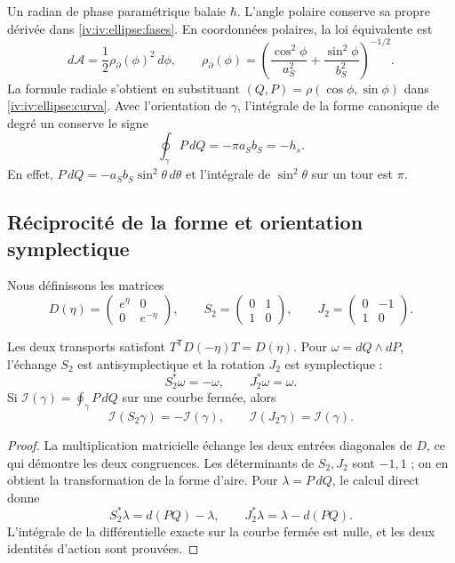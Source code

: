Un radian de phase paramétrique balaie \(\hbar\). L’angle
polaire conserve sa propre dérivée dans
\eqref{iv:iv:ellipse:fases}. En coordonnées polaires, la loi
équivalente est
\[
 d\mathcal A=\frac12\rho_{\partial}(\phi)^2\,d\phi,\qquad
 \rho_{\partial}(\phi)=
 \left(\frac{\cos^2\phi}{a_S^2}
       +\frac{\sin^2\phi}{b_S^2}\right)^{-1/2}.
\]
La formule radiale s’obtient en substituant
\((Q,P)=\rho(\cos\phi,\sin\phi)\) dans
\eqref{iv:iv:ellipse:curva}. Avec l’orientation de
\(\gamma\), l’intégrale de la forme canonique de degré un conserve
le signe
\begin{equation}
 \oint_\gamma P\,dQ=-\pi a_Sb_S=-h_s.
 \label{iv:iv:ellipse:accion-orientada}
\end{equation}
En effet, \(P\,dQ=-a_Sb_S\sin^2\theta\,d\theta\) et
l’intégrale de \(\sin^2\theta\) sur un tour est \(\pi\).

\subsection{Réciprocité de la forme et orientation symplectique}
\label{iv:iv:ellipse:reciprocidad}

Nous définissons les matrices
\begin{equation}
 D(\eta)=\begin{pmatrix}e^\eta&0\\0&e^{-\eta}\end{pmatrix},
 \qquad
 S_2=\begin{pmatrix}0&1\\1&0\end{pmatrix},
 \qquad
 J_2=\begin{pmatrix}0&-1\\1&0\end{pmatrix}.
 \label{iv:iv:ellipse:transportes}
\end{equation}

\begin{proposition}
\label{iv:iv:ellipse:accion-reciproca}
Les deux transports satisfont
\(T^{\mathsf T}D(-\eta)T=D(\eta)\).
Pour \(\omega=dQ\wedge dP\), l’échange \(S_2\) est
antisymplectique et la rotation \(J_2\) est symplectique :
\[
 S_2^*\omega=-\omega,\qquad J_2^*\omega=\omega.
\]
Si \(\mathcal I(\gamma)=\oint_\gamma P\,dQ\) sur une
courbe fermée, alors
\begin{equation}
 \mathcal I(S_2\gamma)=-\mathcal I(\gamma),\qquad
 \mathcal I(J_2\gamma)=\mathcal I(\gamma).
 \label{iv:iv:ellipse:signos-accion}
\end{equation}
\end{proposition}
\begin{proof}
La multiplication matricielle échange les deux entrées
diagonales de \(D\), ce qui démontre les deux congruences.
Les déterminants de \(S_2,J_2\) sont \(-1,1\) ;
on en obtient la transformation de la forme d’aire.
Pour \(\lambda=P\,dQ\), le calcul direct donne
\[
 S_2^*\lambda=d(PQ)-\lambda,\qquad
 J_2^*\lambda=\lambda-d(PQ).
\]
L’intégrale de la différentielle exacte sur la courbe fermée
est nulle, et les deux identités d’action sont prouvées.
\end{proof}

